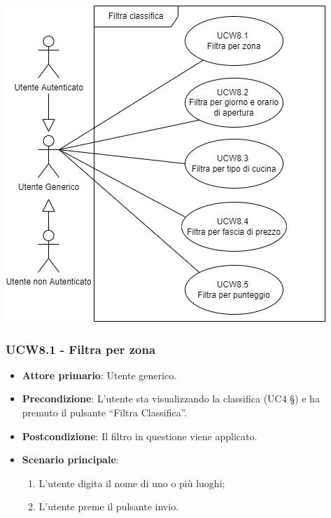 \begin{center}
    \includegraphics[scale=0.5]{UC_images/UCW8.png}
\end{center}

\subsubsection{UCW8.1 - Filtra per zona}
\begin{itemize}
    \item \textbf{Attore primario}: Utente generico.
    \item \textbf{Precondizione}: L’utente sta visualizzando la classifica (UC4 §) e ha premuto il pulsante “Filtra Classifica”.
    \item \textbf{Postcondizione}: Il filtro in questione viene applicato.
    \item \textbf{Scenario principale}: 
    \begin{enumerate}
        \item L’utente digita il nome di uno o più luoghi;
        \item L’utente preme il pulsante invio.
    \end{enumerate}
\end{itemize}

